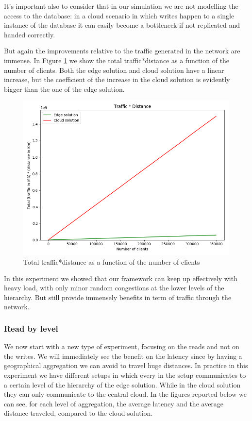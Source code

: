 It's important also to consider that in our simulation we are not modelling the access to the database: in a cloud scenario in which writes happen to a single instance of the database it can easily become a bottleneck if not replicated and handed correctly.

But again the improvements relative to the traffic generated in the network are immense. In Figure \ref{fig:/write-all-clients-traffic} we show the total traffic*distance as a function of the number of clients. Both the edge solution and cloud solution have a linear increase, but the coefficient of the increase in the cloud solution is evidently bigger than the one of the edge solution.

\begin{figure}[H]
    \centering
    \includegraphics[width=0.86\linewidth]{Figures/Evaluation/write-all-clients-traffic.png}
    \caption{Total traffic*distance as a function of the number of clients}
    \label{fig:/write-all-clients-traffic}
\end{figure}

In this experiment we showed that our framework can keep up effectively with heavy load, with only minor random congestions at the lower levels of the hierarchy. But still provide immensely benefits in term of traffic through the network.


\subsubsection{Read by level}
We now start with a new type of experiment, focusing on the reads and not on the writes. We will immediately see the benefit on the latency since by having a geographical aggregation we can avoid to travel huge distances.
In practice in this experiment we have different setups in which every  in the setup communicates to a certain level of the hierarchy of the edge solution. While in the cloud solution they can only communicate to the central cloud.
In the figures reported below we can see, for each level of aggregation, the average latency and the average distance traveled, compared to the cloud solution.

